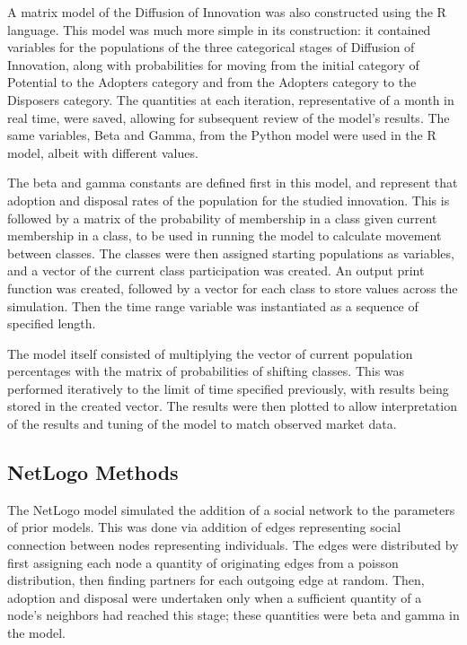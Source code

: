 \documentclass[11pt]{article}
\begin{document}
A matrix model of the Diffusion of Innovation was also constructed using the R language. This model was much more simple in its construction: it contained variables for the populations of the three categorical stages of Diffusion of Innovation, along with probabilities for moving from the initial category of Potential to the Adopters category and from the Adopters category to the Disposers category. The quantities at each iteration, representative of a month in real time, were saved, allowing for subsequent review of the model's results. The same variables, Beta and Gamma, from the Python model were used in the R model, albeit with different values.


The beta and gamma constants are defined first in this model, and represent that adoption and disposal rates of the population for the studied innovation. This is followed by a matrix of the probability of membership in a class given current membership in a class, to be used in running the model to calculate movement between classes. The classes were then assigned starting populations as variables, and a vector of the current class participation was created. An output print function was created, followed by a vector for each class to store values across the simulation. Then the time range variable was instantiated as a sequence of specified length.


The model itself consisted of multiplying the vector of current population percentages with the matrix of probabilities of shifting classes. This was performed iteratively to the limit of time specified previously, with results being stored in the created vector. The results were then plotted to allow interpretation of the results and tuning of the model to match observed market data.


\subsection{NetLogo Methods}

The NetLogo model simulated the addition of a social network to the parameters of prior models. This was done via addition of edges representing social connection between nodes representing individuals. The edges were distributed by first assigning each node a quantity of originating edges from a poisson distribution, then finding partners for each outgoing edge at random. Then, adoption and disposal were undertaken only when a sufficient quantity of a node's neighbors had reached this stage; these quantities were beta and gamma in the model. 
\end{document}
